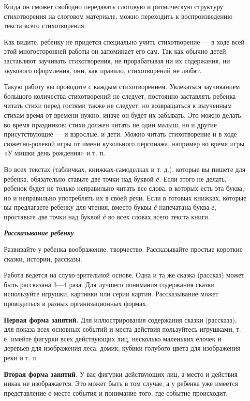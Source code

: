 \documentclass{book}
\renewcommand{\emph}[1]{\textit{#1}}
\begin{document}
Когда он сможет свободно передавать слоговую и ритмическую структуру
стихотворения на слоговом материале, можно переходить к воспроизведению
текста всего стихотворения.

Как видите, ребенку не придется специально учить стихотворение --- в
ходе всей этой многосторонней работы он запоминает его сам. Так как
обычно детей заставляют заучивать стихотворения, не прорабатывая ни их
содержания, ни звукового оформления, они, как правило, стихотворений не
любят.

Такую работу вы проводите с каждым стихотворением. Увлекаться
заучиванием большого количества стихотворений не следует, постоянно
заставлять ребенка читать стихи перед гостями также не следует, но
возвращаться к выученным стихам время от времени нужно, иначе он будет
их забывать. Это можно делать во время праздников: стихи должен читать
не один малыш, но и другие присутствующие --- и взрослые, и дети. Можно
читать стихотворение и в ходе сюжетно-ролевой игры от имени кукольного
персонажа, например во время игры «У мишки день рождения» и т. п.

Во всех текстах (табличках, книжках-самоделках и т. д.), которые вы
пишете для ребенка, обязательно ставьте две точки над буквой \emph{ё.}
Если этого не делать, ребенок будет не только неправильно читать все
слова, в которых есть эта буква, но и неправильно употреблять их в своей
речи. Если в готовых книжках, которые вы предлагаете ребенку для чтения,
вместо буквы \emph{ё} напечатана буква \emph{е,} проставьте две точки
над буквой \emph{ё} во всех словах всего текста книги.

\emph{\textbf{Рассказывание ребенку}}

Развивайте у ребенка воображение, творчество. Рассказывайте простые
короткие сказки, истории, рассказы.

Работа ведется на слухо-зрительной основе. Одна и та же сказка (рассказ)
может быть рассказана 3---4 раза. Для лучшего понимания содержания
сказки используйте игрушки, картинки или серии картин. Рассказывание
может проводиться в разных организационных формах.

\textbf{Первая форма занятий.} Для иллюстрирования содержания сказки
(рассказа), для показа всех основных событий и места действия
пользуйтесь игрушками, т. е. имейте фигурки всех действующих лиц,
несколько маленьких ёлочек и деревьев для изображения леса; домик;
кубики голубого цвета для изображения реки и т. п.

\textbf{Вторая форма занятий}. У вас фигурки действующих лиц, а место и
действия никак не изображается. Это может быть в том случае, а у ребенка
уже имеется представление о месте события и понимание того, где событие
происходит.
\end{document}
